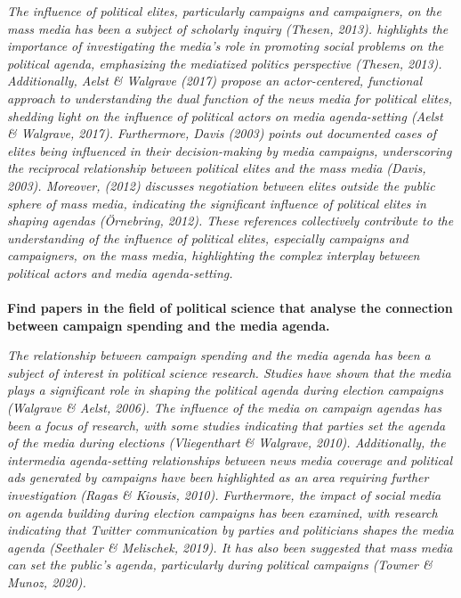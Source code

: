 \documentclass[11pt,a4paper]{article}
\begin{document}
\textit{The influence of political elites, particularly campaigns and campaigners, on the mass media has been a subject of scholarly inquiry (Thesen, 2013). highlights the importance of investigating the media's role in promoting social problems on the political agenda, emphasizing the mediatized politics perspective (Thesen, 2013). Additionally, Aelst \& Walgrave (2017) propose an actor-centered, functional approach to understanding the dual function of the news media for political elites, shedding light on the influence of political actors on media agenda-setting (Aelst \& Walgrave, 2017). Furthermore, Davis (2003) points out documented cases of elites being influenced in their decision-making by media campaigns, underscoring the reciprocal relationship between political elites and the mass media (Davis, 2003). Moreover, (2012) discusses negotiation between elites outside the public sphere of mass media, indicating the significant influence of political elites in shaping agendas (Örnebring, 2012). These references collectively contribute to the understanding of the influence of political elites, especially campaigns and campaigners, on the mass media, highlighting the complex interplay between political actors and media agenda-setting.}
\\
\\
 \textbf{Find papers in the field of political science that analyse the connection between campaign spending and the media agenda.}

\textit{The relationship between campaign spending and the media agenda has been a subject of interest in political science research. Studies have shown that the media plays a significant role in shaping the political agenda during election campaigns (Walgrave \& Aelst, 2006). The influence of the media on campaign agendas has been a focus of research, with some studies indicating that parties set the agenda of the media during elections (Vliegenthart \& Walgrave, 2010). Additionally, the intermedia agenda-setting relationships between news media coverage and political ads generated by campaigns have been highlighted as an area requiring further investigation (Ragas \& Kiousis, 2010). Furthermore, the impact of social media on agenda building during election campaigns has been examined, with research indicating that Twitter communication by parties and politicians shapes the media agenda (Seethaler \& Melischek, 2019). It has also been suggested that mass media can set the public’s agenda, particularly during political campaigns (Towner \& Munoz, 2020).}
\end{document}

